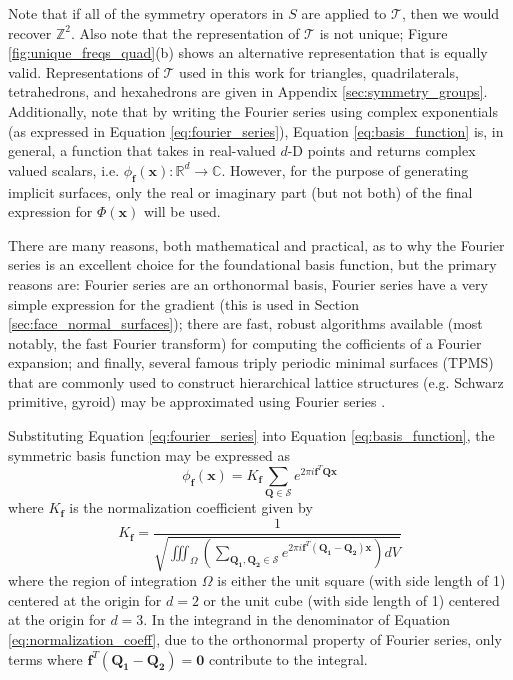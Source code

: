 \documentclass[acmtog]{acmart}
\begin{document}
%
Note that if all of the symmetry operators in $S$ are applied to $\mathcal{T}$, then we would recover $\mathbb{Z}^2$. Also note that the representation of $\mathcal{T}$ is not unique; Figure \ref{fig:unique_freqs_quad}(b) shows an alternative representation that is equally valid. Representations of $\mathcal{T}$ used in this work for triangles, quadrilaterals, tetrahedrons, and hexahedrons are given in Appendix \ref{sec:symmetry_groups}. Additionally, note that by writing the Fourier series using complex exponentials (as expressed in Equation \ref{eq:fourier_series}), Equation \ref{eq:basis_function} is, in general, a function that takes in real-valued $d$-D points and returns complex valued scalars, i.e. $\phi_{\mathbf{f}}(\mathbf{x}): \mathbb{R}^d \rightarrow \mathbb{C}$. However, for the purpose of generating implicit surfaces, only the real or imaginary part (but not both) of the final expression for $\Phi(\mathbf{x})$ will be used.

There are many reasons, both mathematical and practical, as to why the Fourier series is an excellent choice for the foundational basis function, but the primary reasons are: Fourier series are an orthonormal basis, Fourier series have a very simple expression for the gradient (this is used in Section \ref{sec:face_normal_surfaces}); there are fast, robust algorithms available (most notably, the fast Fourier transform) for computing the cofficients of a Fourier expansion; and finally, several famous triply periodic minimal surfaces (TPMS) that are commonly used to construct hierarchical lattice structures (e.g. Schwarz primitive, gyroid) may be approximated using Fourier series \cite{wohlgemuth2001triply}.

Substituting Equation \ref{eq:fourier_series} into Equation \ref{eq:basis_function}, the symmetric basis function may be expressed as
%
\begin{equation}
  \label{eq:basis_function_actual}
  \phi_{\mathbf{f}}(\mathbf{x}) = K_{\mathbf{f}} \sum\limits_{\mathbf{Q} \in \mathcal{S}} e^{2 \pi i \mathbf{f}^T \mathbf{Q} \mathbf{x}}
\end{equation}
%
where $K_{\mathbf{f}}$ is the normalization coefficient given by
%
\begin{equation}
  \label{eq:normalization_coeff}
  K_{\mathbf{f}} = \frac{1}{\sqrt{ \iiint_\Omega \left( \sum\limits_{\mathbf{Q_1}, \mathbf{Q_2} \in \mathcal{S}} e^{2 \pi i \mathbf{f}^T (\mathbf{Q_1 - Q_2}) \mathbf{x}} \right) dV }}
\end{equation}
%
where the region of integration $\Omega$ is either the unit square (with side length of 1) centered at the origin for $d = 2$ or the unit cube (with side length of 1) centered at the origin for $d = 3$. In the integrand in the denominator of Equation \ref{eq:normalization_coeff}, due to the orthonormal property of Fourier series, only terms where $\mathbf{f}^T (\mathbf{Q_1 - Q_2}) = \mathbf{0}$ contribute to the integral.
\end{document}
